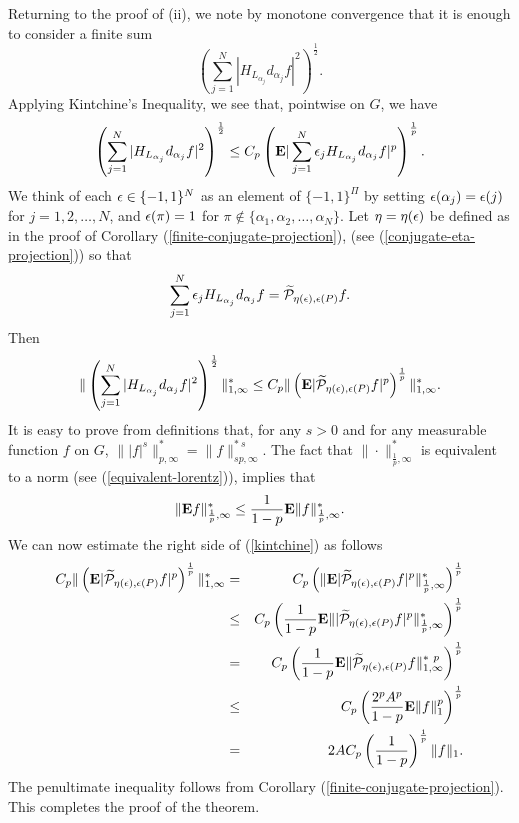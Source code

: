 Returning to the proof of (ii), we note 
by monotone convergence that it is enough
to consider a finite sum 
$$ \left( \sum_{j=1}^N 
| H_{L_{\alpha_j}} d_{\alpha_j} f|^2
\right)^\frac{1}{2}. $$
Applying Kintchine's Inequality, we see that,
pointwise on $G$, we have
$$
 \left( \sum_{j=1}^N 
| H_{L_{\alpha_j}} d_{\alpha_j} f|^2
\right)^\frac{1}{2}
\leq C_p 
 \left(  \E | \sum_{j=1}^N 
 \e_j H_{L_{\alpha_j}} d_{\alpha_j} f|^p
 \right)^\frac{1}{p}.  
 $$
We think of each $\epsilon\in \{-1,1\}^N$
as an element of $\{-1,1 \}^\Pi$ by setting
$\epsilon(\alpha_j)=\epsilon(j)$ for $j=1,2,\ldots,N$, and
$\epsilon(\pi)=1$ for $\pi \not\in 
\{\alpha_1, \alpha_2,\ldots , \alpha_N\}$. 
Let $\eta=\eta(\epsilon) $
be defined as in the proof of 
Corollary (\ref{finite-conjugate-projection}), 
(see (\ref{conjugate-eta-projection})) so that
$$\sum_{j=1}^N 
 \epsilon_j H_{L_{\alpha_j}} d_{\alpha_j} f=
 \widetilde{{\cal P}}_{\eta (\epsilon), \epsilon(P)}f.$$
Then
\begin{equation}
\|  \left( \sum_{j=1}^N 
| H_{L_{\alpha_j}} d_{\alpha_j} f|^2
\right)^\frac{1}{2} \|^*_{1,\infty}
\leq C_p 
 \| \left(  \E | \widetilde{{\cal P}}_{\eta(\e), \e(P)}f|^p
 \right)^\frac{1}{p} 
 \|^*_{1,\infty}.
\label{kintchine}
\end{equation}
It is easy to prove from definitions that,
for any $s>0$ and for any
measurable function $f$ on $G$,
$\| | f |^s \|^*_{p,\infty}= 
\| f  \|^{*\ s}_{s p,\infty}.$
%
%
%
The
fact that $\| \cdot\|^*_{\frac{1}{p},\infty}$
is equivalent to a norm (see (\ref{equivalent-lorentz})),
implies that 
$$\| \E f \|^*_{\frac{1}{p},\infty}\leq 
		\frac{1}{1-p}   \E\| f\|^*_{\frac{1}{p},\infty}.$$
%
We can now estimate the right side of (\ref{kintchine})
as follows
\begin{eqnarray*}
 C_p 
 \| \left(  \E | \widetilde{{\cal P}}_{\eta(\e), \e(P)}f|^p
 \right)^\frac{1}{p} 
 \|^*_{1,\infty}
 		&=&
C_p \left( \|   \E | \widetilde{{\cal P}}_{\eta (\e), \e (P)}f|^p
  \|^*_{\frac{1}{p} ,\infty} \right)^\frac{1}{p}\\
 		&\leq&
 C_p \left(
 \frac{1}{1-p}
   \E \|   | \widetilde{{\cal P}}_{\eta(\e), \e(P)}f |^p
  \|^{*}_{\frac{1}{p} ,\infty} \right)^\frac{1}{p}\\
		&=&
C_p \left(
\frac{1}{1-p}
   \E \|    \widetilde{{\cal P}}_{\eta(\e), \e(P)}f 
  \|^{*\ p}_{1 ,\infty} \right)^\frac{1}{p}\\
		&\leq&
 C_p \left(
 \frac{2^p A^p}{1-p}
    \E \| f 
 \|^p_1 \right)^\frac{1}{p}\\
		&=&
  2 A C_p \left( \frac{1}{1-p}\right)^\frac{1}{p}
  \| f\|_1 .
\end{eqnarray*}
%
%
%
The penultimate inequality follows from 
Corollary (\ref{finite-conjugate-projection}).
This completes the proof of the theorem.

